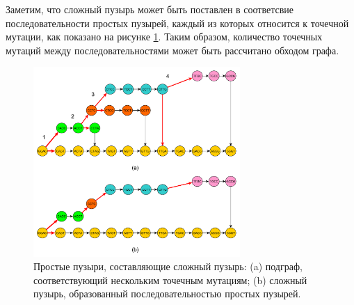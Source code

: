 Заметим, что сложный пузырь может быть поставлен в соответсвие последовательности простых пузырей, каждый из которых относится к точечной мутации, как показано на рисунке \ref{fig:pm_to_cv}. Таким образом, количество точечных мутаций между последовательностями может быть рассчитано обходом графа.
\begin{figure}[h!t]
	\centering
	\includegraphics[width=0.7\textwidth]{img/pm_to_cv.pdf}
	\caption{Простые пузыри, составляющие сложный пузырь: (a) подграф, соответствующий нескольким точечным мутациям; (b) сложный пузырь, образованный последовательностью простых пузырей.}
	\label{fig:pm_to_cv}
\end{figure}

\pagebreak